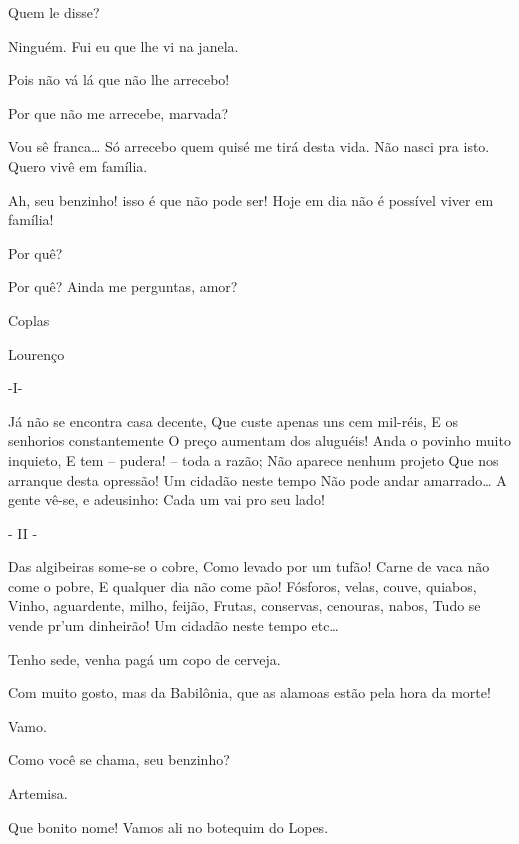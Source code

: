  Quem le disse?

 Ninguém. Fui eu que lhe vi na janela.

 Pois não vá lá que não lhe arrecebo!

 Por que não me arrecebe, marvada?

 Vou sê franca\ldots{} Só arrecebo quem quisé me tirá desta vida. Não
nasci pra isto. Quero vivê em família.

 Ah, seu benzinho! isso é que não pode ser! Hoje em dia não é
possível viver em família!

 Por quê?

 Por quê? Ainda me perguntas, amor?

 Coplas

 Lourenço

 -I-

 Já não se encontra casa decente, 
 Que custe apenas uns cem mil-réis, 
 E os senhorios constantemente 
 O preço aumentam dos aluguéis! 
 Anda o povinho muito inquieto, 
 E tem -- pudera! -- toda a razão; 
 Não aparece nenhum projeto 
 Que nos arranque desta opressão! 
 Um cidadão neste tempo 
 Não pode andar amarrado\ldots{} 
 A gente vê-se, e adeusinho: 
 Cada um vai pro seu lado!

 - II -

 Das algibeiras some-se o cobre, 
 Como levado por um tufão! 
 Carne de vaca não come o pobre, 
 E qualquer dia não come pão! 
 Fósforos, velas, couve, quiabos, 
 Vinho, aguardente, milho, feijão, 
 Frutas, conservas, cenouras, nabos, 
 Tudo se vende pr’um dinheirão! 
 Um cidadão neste tempo etc\ldots{}

 Tenho sede, venha pagá um copo de cerveja.

 Com muito gosto, mas da Babilônia, que as alamoas estão pela
hora da morte!

 Vamo.

 Como você se chama, seu benzinho?

 Artemisa.

 Que bonito nome! Vamos ali no botequim do Lopes. 



